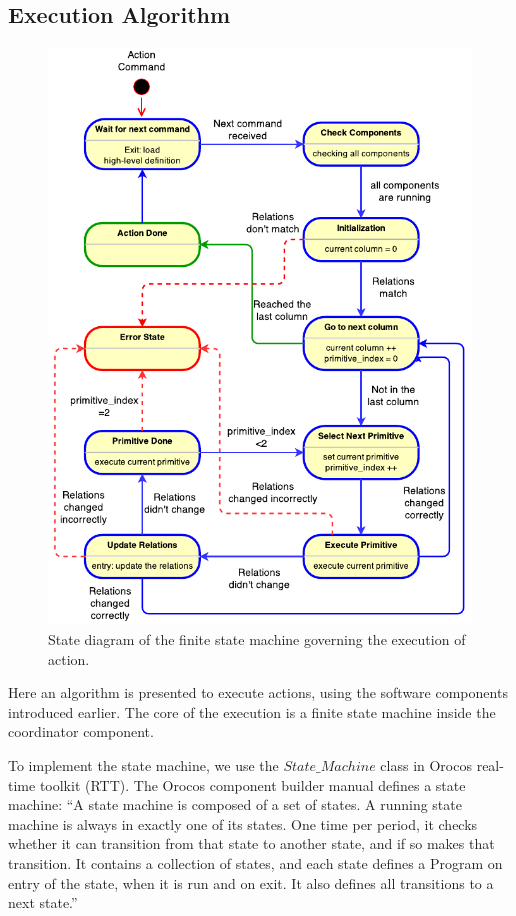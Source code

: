 \subsection{Execution Algorithm}
\label{sec:execution_algorithm}
\begin{figure}
      \centering
      \includegraphics[scale=1]{./pdf/coordinator_fsm.pdf}
      \caption{ State diagram of the finite state machine governing the execution of action.
}
      \label{fig:coordinator_fsm}
\end{figure}
Here an algorithm is presented to execute actions, using the software components introduced earlier.
The core of the execution is a finite state machine inside the coordinator component.

To implement the state machine, we use the $State\_Machine$ class in Orocos real-time toolkit (RTT).
The Orocos component builder manual defines a state machine:
``A state machine is composed of a set of states. A running state machine is always in exactly one of its states.
One time per period, it checks whether it can transition from that state to another state, and if so makes that transition.
It contains a collection of states, and each state defines a Program on entry of the state, when it is run and on exit.
It also defines all transitions to a next state.''

